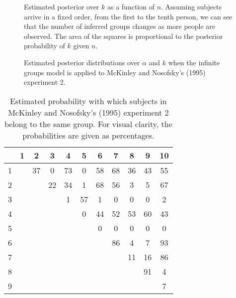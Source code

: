 \documentclass[authoryear]{elsarticle}
\newcommand{\bfc}{}
\newcommand{\efc}{\vspace*{15pt}}
\newcommand{\fcs}{}
\begin{document}
\begin{figure}[t]
\begin{center}
\caption{Estimated posterior over $k$ as a function of $n$. Assuming subjects
arrive in a fixed order, from the first to the tenth person, we can see that the
number of inferred groups changes as more people are observed. The area of the
squares is proportional to the posterior probability of $k$ given $n$. \efc}
\label{catgrow}
\end{center}
\end{figure}

\begin{figure}[t]
\begin{center}
\caption{\bfc Estimated posterior distributions \fcs over $\alpha$ and $k$
when the infinite groups model is applied to \fcs McKinley and Nosofsky's (1995)
experiment 2.\efc}
\label{mn2}
\end{center}
\end{figure}

\begin{table}[t]\begin{center}
\caption{\bfc Estimated probability with which \fcs subjects in
McKinley and Nosofsky's (1995) experiment \fcs 2 belong to the same
group. For visual clarity, the probabilities are given as percentages.}
\label{covar}
\protect\footnotesize \vspace*{5pt}
\begin{tabular}{c|cccccccccc}
&1&2&3&4&5&6&7&8&9&10 \\  \hline
1&&37&0&73&0&58&68&36&43&55 \vspace*{-5pt}\\
2&&&22&34&1&68&56&3&5&67 \vspace*{-5pt}\\
3&&&&1&57&1&0&0&0&2 \vspace*{-5pt}\\
4&&&&&0&44&52&53&60&43 \vspace*{-5pt}\\
5&&&&&&0&0&0&0&0 \vspace*{-5pt}\\
6&&&&&&&86&4&7&93 \vspace*{-5pt}\\
7&&&&&&&&11&16&86 \vspace*{-5pt}\\
8&&&&&&&&&91&4 \vspace*{-5pt}\\
9&&&&&&&&&&7 \\
\end{tabular}
\vspace*{10pt}
\protect\normalsize
\end{center}\end{table}
\end{document}
